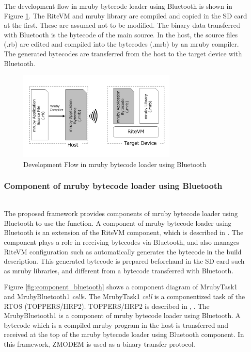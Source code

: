 \documentclass[conference,compsoc]{IEEEtran}
\begin{document}
The development flow in mruby bytecode loader using Bluetooth is shown in Figure \ref{fig:bluetooth_loader}.
The RiteVM and mruby library are compiled and copied in the SD card at the first.
These are assumed not to be modified.
The binary data transferred with Bluetooth is the bytecode of the main source.
In the host, the source files (.rb) are edited and compiled into the bytecodes (.mrb) by an mruby compiler.
The generated bytecodes are transferred from the host to the target device with Bluetooth.

\begin{figure}[t]
    \centering
    \includegraphics[width=8cm,clip]{figure/bluetooth_loader.pdf}
    \caption{Development Flow in mruby bytecode loader using Bluetooth}
    \label{fig:bluetooth_loader}
\end{figure}

\subsubsection{Component of mruby bytecode loader using Bluetooth} \mbox{}\\

The proposed framework provides components of mruby bytecode loader using Bluetooth to use the function.
A component of mruby bytecode loader using Bluetooth is an extension of the RiteVM component, which is described in \cite{par:mrubyonTECS}.
The component plays a role in receiving bytecodes via Bluetooth, and also manages RiteVM configuration such as automatically generates the bytecode in the build description.
This generated bytecode is prepared beforehand in the SD card such as mruby libraries, and different from a bytecode transferred with Bluetooth.

Figure \ref{fig:component_bluetooth} shows a component diagram of MrubyTask1 and MrubyBluetooth1 {\it cell}s.
The MrubyTask1 {\it cell} is a componentized task of the RTOS (TOPPERS/HRP2).
TOPPERS/HRP2 is described in \cite{url:HRP2}, \cite{par:hr-tecs}.
The MrubyBluetooth1 is a component of mruby bytecode loader using Bluetooth.
A bytecode which is a compiled mruby program in the host is transferred and received at the top of the mruby bytecode loader using Bluetooth component.
In this framework, ZMODEM \cite{par:zmodem} is used as a binary transfer protocol.
\end{document}
